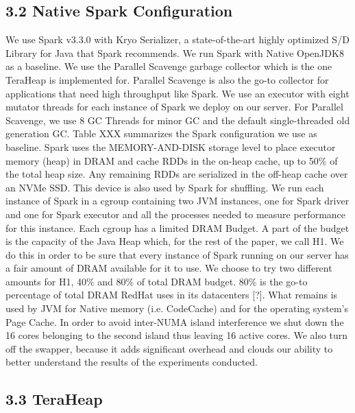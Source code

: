 \documentclass[twocolumn,10pt]{asme2e}
\begin{document}
\subsection*{3.2 Native Spark Configuration}
We use Spark v3.3.0 with Kryo Serializer, a state-of-the-art highly optimized S/D Library for Java that Spark recommends. We run Spark with Native OpenJDK8 as a baseline. We use the Parallel Scavenge garbage collector which is the one TeraHeap is implemented for. Parallel Scavenge is also the go-to collector for applications that need high throughput like Spark. We use an executor with eight mutator threads for each instance of Spark we deploy on our server. For Parallel Scavenge, we use 8 GC Threads for minor GC and the default single-threaded old generation GC. Table XXX summarizes the Spark configuration we use as baseline. Spark uses the MEMORY-AND-DISK storage level to place executor memory (heap) in DRAM and cache RDDs in the on-heap cache, up to 50\% of the total heap size. Any remaining RDDs are serialized in the off-heap cache over an NVMe SSD. This device is also used by Spark for shuffling. We run each instance of Spark in a cgroup containing two JVM instances, one for Spark driver and one for Spark executor and all the processes needed to measure performance for this instance. Each cgroup has a limited DRAM Budget. A part of the budget is the capacity of the Java Heap which, for the rest of the paper, we call H1. We do this in order to be sure that every instance of Spark running on our server has a fair amount of DRAM available for it to use. We choose to try two different amounts for H1, 40\% and 80\% of total DRAM budget. 80\% is the go-to percentage of total DRAM RedHat uses in its datacenters [?]. What remains is used by JVM for Native memory (i.e. CodeCache) and for the operating system's Page Cache. In order to avoid inter-NUMA island interference we shut down the 16 cores belonging to the second island thus leaving 16 active cores. We also turn off the swapper, because it adds significant overhead and clouds our ability to better understand the results of the experiments conducted.

\subsection*{3.3 TeraHeap}
\end{document}
